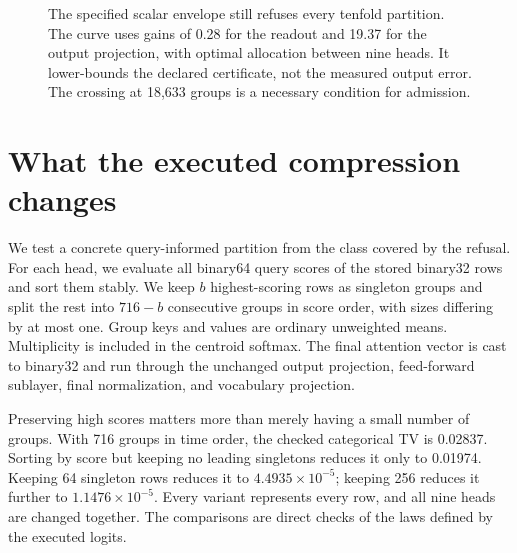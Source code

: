\documentclass[10pt]{article}
\theoremstyle{definition}\newtheorem{definition}[theorem]{Definition}
\begin{document}
\begin{figure}[t]
\centering
{}
\caption{The specified scalar envelope still refuses every tenfold partition. The curve uses gains of 0.28 for the readout and 19.37 for the output projection, with optimal allocation between nine heads. It lower-bounds the declared certificate, not the measured output error. The crossing at 18,633 groups is a necessary condition for admission.}
\label{fig:packing}
\end{figure}

\section{What the executed compression changes}
\label{sec:shift}
We test a concrete query-informed partition from the class covered by the refusal. For each head, we evaluate all binary64 query scores of the stored binary32 rows and sort them stably. We keep $b$ highest-scoring rows as singleton groups and split the rest into $716-b$ consecutive groups in score order, with sizes differing by at most one. Group keys and values are ordinary unweighted means. Multiplicity is included in the centroid softmax. The final attention vector is cast to binary32 and run through the unchanged output projection, feed-forward sublayer, final normalization, and vocabulary projection.

Preserving high scores matters more than merely having a small number of groups. With 716 groups in time order, the checked categorical TV is 0.02837. Sorting by score but keeping no leading singletons reduces it only to 0.01974. Keeping 64 singleton rows reduces it to $4.4935\times10^{-5}$; keeping 256 reduces it further to $1.1476\times10^{-5}$. Every variant represents every row, and all nine heads are changed together. The comparisons are direct checks of the laws defined by the executed logits.
\end{document}
